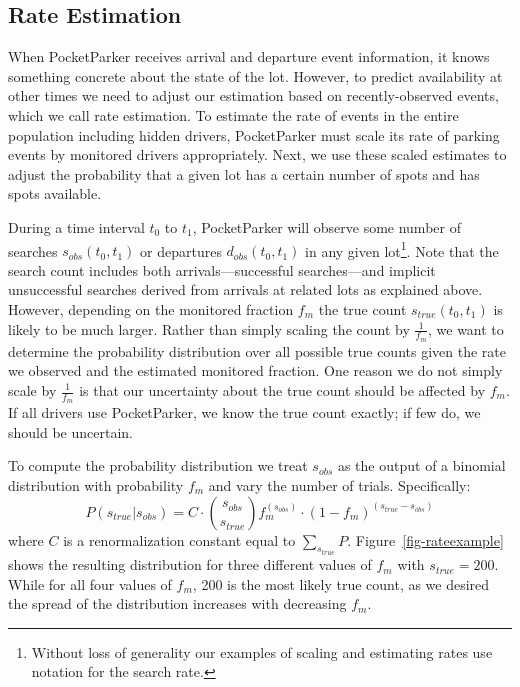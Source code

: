 \subsection{Rate Estimation}
\label{subsec-rates}

When PocketParker receives arrival and departure event information, it knows
something concrete about the state of the lot. However, to predict
availability at other times we need to adjust our estimation based on
recently-observed events, which we call rate estimation. To estimate the rate
of events in the entire population including hidden drivers, PocketParker
must scale its rate of parking events by monitored drivers appropriately.
Next, we use these scaled estimates to adjust the probability that a given
lot has a certain number of spots and has spots available.

During a time interval $t_0$ to $t_1$, PocketParker will observe some number
of searches $s_{obs}(t_0, t_1)$ or departures $d_{obs}(t_0, t_1)$ in any
given lot\footnote{Without loss of generality our examples of scaling and
estimating rates use notation for the search rate.}. Note that the search
count includes both arrivals---successful searches---and implicit
unsuccessful searches derived from arrivals at related lots as explained
above. However, depending on the monitored fraction $f_m$ the true count
$s_{true}(t_0, t_1)$ is likely to be much larger. Rather than simply scaling
the count by $\frac{1}{f_m}$, we want to determine the probability
distribution over all possible true counts given the rate we observed and the
estimated monitored fraction. One reason we do not simply scale by
$\frac{1}{f_m}$ is that our uncertainty about the true count should be
affected by $f_m$. If all drivers use PocketParker, we know the true count
exactly; if few do, we should be uncertain.

To compute the probability distribution we treat $s_{obs}$ as the output of a
binomial distribution with probability $f_m$ and vary the number of trials.
Specifically:
%
\begin{equation} P(s_{true}| s_{obs}) = C \cdot {s_{obs} \choose s_{true}}
f_m^{(s_{obs})} \cdot (1 - f_m)^{(s_{true} - s_{obs})} \end{equation}
%
where $C$ is a renormalization constant equal to $\sum_{s_{true}} P$.
Figure~\ref{fig-rateexample} shows the resulting distribution for three
different values of $f_m$ with $s_{true} = 200$. While for all four values of
$f_m$, 200 is the most likely true count, as we desired the spread of the
distribution increases with decreasing $f_m$.

